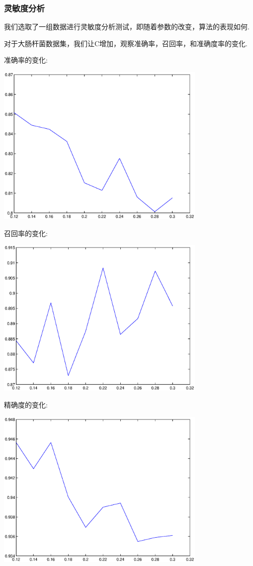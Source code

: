 \documentclass[article,12pt]{article}
\begin{document}
\subsubsection{灵敏度分析}
我们选取了一组数据进行灵敏度分析测试，即随着参数的改变，算法的表现如何.

对于大肠杆菌数据集，我们让C增加，观察准确率，召回率，和准确度率的变化.

准确率的变化:


\begin{center}
\includegraphics[width = 4in]{precision.eps}
\end{center}

召回率的变化:

\begin{center}
\includegraphics[width = 4in]{recall.eps}
\end{center}

精确度的变化:


\begin{center}
\includegraphics[width = 4in]{prec.eps}
\end{center}
\end{document}
